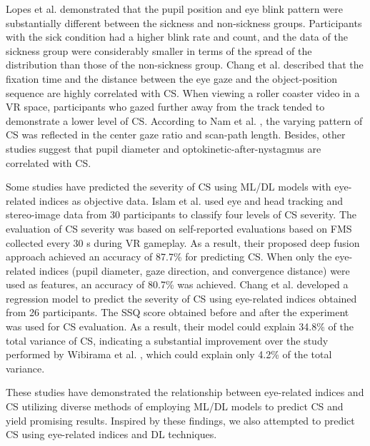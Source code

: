 \documentclass{ieeeaccess}
\begin{document}
Lopes et al. \cite{Lopes_2020} demonstrated that the pupil position and eye blink pattern were substantially different between the sickness and non-sickness groups. Participants with the sick condition had a higher blink rate and count, and the data of the sickness group were considerably smaller in terms of the spread of the distribution than those of the non-sickness group. Chang et al. \cite{Chang_2021} described that the fixation time and the distance between the eye gaze and the object-position sequence are highly correlated with CS. When viewing a roller coaster video in a VR space, participants who gazed further away from the track tended to demonstrate a lower level of CS. According to Nam et al. \cite{Nam_2022}, the varying pattern of CS was reflected in the center gaze ratio and scan-path length. Besides, other studies suggest that pupil diameter \cite{Oyamada_2007} and optokinetic-after-nystagmus \cite{Guo_2011} are correlated with CS. 

Some studies have predicted the severity of CS using ML/DL models with eye-related indices as objective data. Islam et al. \cite{Islam_2021} used eye and head tracking and stereo-image data from 30 participants to classify four levels of CS severity. The evaluation of CS severity was based on self-reported evaluations based on FMS collected every 30 s during VR gameplay. As a result, their proposed deep fusion approach achieved an accuracy of 87.7\% for predicting CS. When only the eye-related indices (pupil diameter, gaze direction, and convergence distance) were used as features, an accuracy of 80.7\% was achieved. Chang et al. \cite{Chang_2021} developed a regression model to predict the severity of CS using eye-related indices obtained from 26 participants. The SSQ score obtained before and after the experiment was used for CS evaluation. As a result, their model could explain 34.8\% of the total variance of CS, indicating a substantial improvement over the study performed by Wibirama et al. \cite{Wibirama_2020}, which could explain only 4.2\% of the total variance. 

These studies have demonstrated the relationship between eye-related indices and CS utilizing diverse methods of employing ML/DL models to predict CS and yield promising results. Inspired by these findings, we also attempted to predict CS using eye-related indices and DL techniques.
\end{document}
